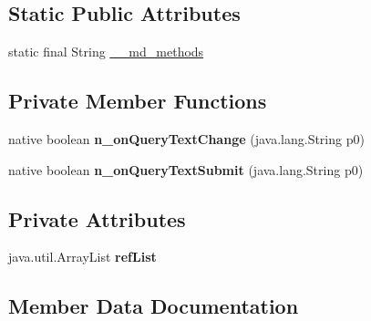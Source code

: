 \subsection*{Static Public Attributes}
\begin{DoxyCompactItemize}
\item 
static final String \hyperlink{classmd5b60ffeb829f638581ab2bb9b1a7f4f3f_1_1SearchBarRenderer_a5f0e642da7b2413e781c8137331a275e}{\+\_\+\+\_\+md\+\_\+methods}
\end{DoxyCompactItemize}
\subsection*{Private Member Functions}
\begin{DoxyCompactItemize}
\item 
\mbox{\label{classmd5b60ffeb829f638581ab2bb9b1a7f4f3f_1_1SearchBarRenderer_a35b5d784e982cf14b6da8df89ad0d0ee}} 
native boolean {\bfseries n\+\_\+on\+Query\+Text\+Change} (java.\+lang.\+String p0)
\item 
\mbox{\label{classmd5b60ffeb829f638581ab2bb9b1a7f4f3f_1_1SearchBarRenderer_aabe14e5f9bd2010409ee2224b5066103}} 
native boolean {\bfseries n\+\_\+on\+Query\+Text\+Submit} (java.\+lang.\+String p0)
\end{DoxyCompactItemize}
\subsection*{Private Attributes}
\begin{DoxyCompactItemize}
\item 
\mbox{\label{classmd5b60ffeb829f638581ab2bb9b1a7f4f3f_1_1SearchBarRenderer_a0f1acb862b764a09166bdf7a4a2c1e4a}} 
java.\+util.\+Array\+List {\bfseries ref\+List}
\end{DoxyCompactItemize}


\subsection{Member Data Documentation}
\mbox{\label{classmd5b60ffeb829f638581ab2bb9b1a7f4f3f_1_1SearchBarRenderer_a5f0e642da7b2413e781c8137331a275e}} 
